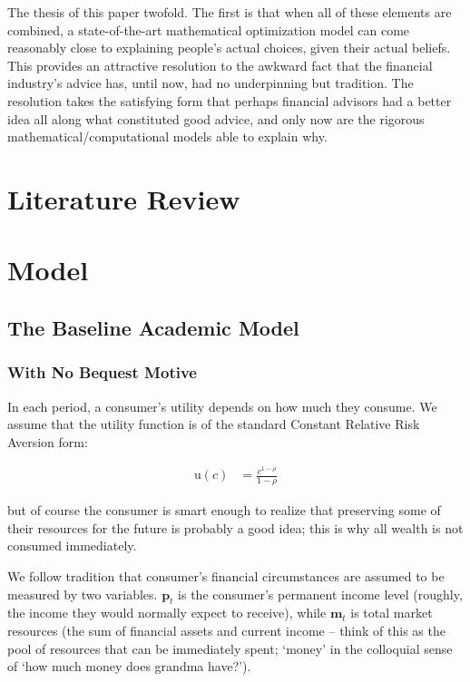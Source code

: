 \documentclass{article}
\newcommand{\CRRA}{\rho}
\newcommand{\uFunc}{\mathrm{u}}
\newcommand{\pLvl}{\mathbf{p}}
\newcommand{\mLvl}{\mathbf{m}}
\begin{document}
The thesis of this paper twofold. The first is that when all of these elements are combined, a state-of-the-art mathematical optimization model can come reasonably close to explaining people's actual choices, given their actual beliefs. This provides an attractive resolution to the awkward fact that the financial industry's advice has, until now, had no underpinning but tradition. The resolution takes the satisfying form that perhaps financial advisors had a better idea all along what constituted good advice, and only now are the rigorous mathematical/computational models able to explain why.

\section{Literature Review}

\cite{Dynan_2002}

\section{Model}

\subsection{The Baseline Academic Model}

\subsubsection{With No Bequest Motive}

In each period, a consumer's utility depends on how much they consume. We assume that the utility function is of the standard Constant Relative Risk Aversion form:

\begin{align}
    \uFunc(c) & = \frac{c^{1-\CRRA}}{1-\CRRA}
\end{align}

but of course the consumer is smart enough to realize that preserving some of their resources for the future is probably a good idea; this is why all wealth is not consumed immediately.

We follow tradition that consumer's financial circumstances are assumed to be measured by two variables. $\pLvl_{t}$ is the consumer's permanent income level (roughly, the income they would normally expect to receive), while $\mLvl_{t}$ is total market resources (the sum of financial assets and current income -- think of this as the pool of resources that can be immediately spent; `money' in the colloquial sense of `how much money does grandma have?').
\end{document}
